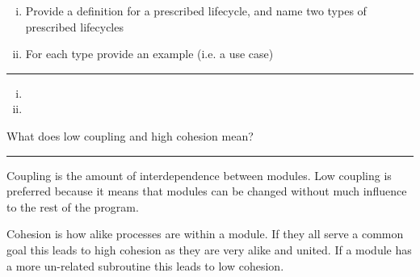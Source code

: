 \documentclass[11pt]{article}
\begin{document}
\begin{enumerate}[i.]
	\item Provide a definition for a prescribed lifecycle, and name two types of prescribed lifecycles
	\item For each type provide an example (i.e. a use case)
\end{enumerate}
\hrule

\begin{enumerate}[i.]
	\item 
	\item 
\end{enumerate}




What does low coupling and high cohesion mean?
\hrule

Coupling is the amount of interdependence between modules. Low coupling is preferred because it means that modules can be changed without much influence to the rest of the program. 

Cohesion is how alike processes are within a module. If they all serve a common goal this leads to high cohesion as they are very alike and united. If a module has a more un-related subroutine this leads to low cohesion.
\cite{post,geeks}







\end{document}
